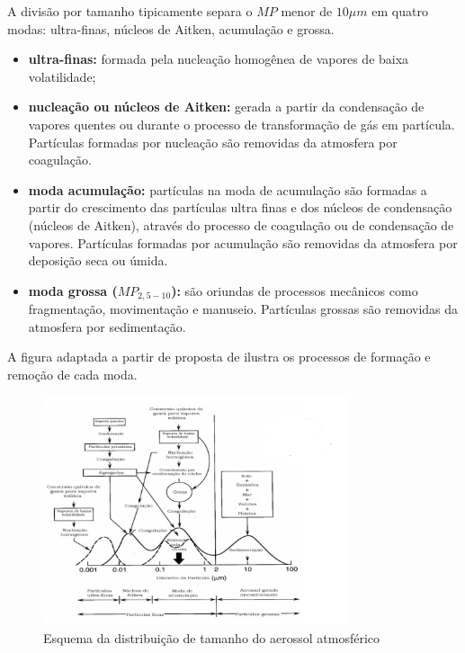 A divisão por tamanho tipicamente separa o $MP$ menor de $10 \mu m$ em quatro modas:
ultra-finas, núcleos de Aitken, acumulação e grossa. 

\begin{itemize}
  \item \textbf{ultra-finas:} formada pela nucleação homogênea de vapores de baixa volatilidade;
  \item \textbf{nucleação ou núcleos de Aitken:} 
        gerada a partir da condensação de vapores quentes ou durante o processo de 
        transformação de gás em partícula. Partículas formadas por 
        nucleação são removidas da atmosfera por coagulação.   
  \item \textbf{moda acumulação:} 
         partículas na moda de acumulação são formadas 
         a partir do crescimento das partículas ultra finas e dos núcleos de condensação (núcleos de Aitken), através do processo de 
         coagulação ou de condensação de vapores. 
         Partículas formadas por acumulação
         são removidas da atmosfera por deposição seca ou úmida.%
  \item \textbf{moda grossa ($MP_{2,5-10}$):} 
        são oriundas de processos mecânicos como fragmentação, 
        movimentação e manuseio. Partículas grossas são removidas da atmosfera 
        por sedimentação.
\end{itemize}

A figura adaptada a partir de proposta de \citep{finlayson1999} ilustra os processos de 
formação e remoção de cada moda.%

\begin{figure}[H]
\begin{center}
  \includegraphics[width=0.8\textwidth]{../inputs/images/modas_aerossol.png}
  \caption{Esquema da distribuição de tamanho do aerossol atmosférico 
           \citep{finlayson1999} \label{fig:modas_aerossol}}
\end{center}
\end{figure}


